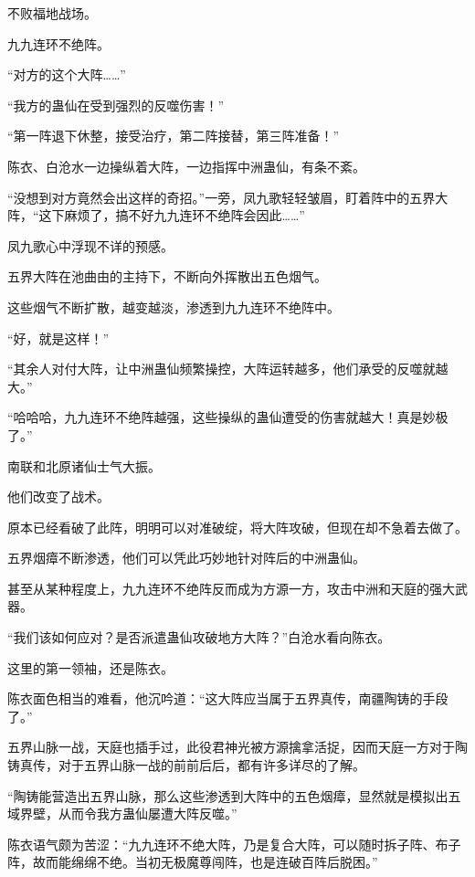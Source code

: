 
\begin{this_body}



不败福地战场。

九九连环不绝阵。

“对方的这个大阵……”

“我方的蛊仙在受到强烈的反噬伤害！”

“第一阵退下休整，接受治疗，第二阵接替，第三阵准备！”

陈衣、白沧水一边操纵着大阵，一边指挥中洲蛊仙，有条不紊。

“没想到对方竟然会出这样的奇招。”一旁，凤九歌轻轻皱眉，盯着阵中的五界大阵，“这下麻烦了，搞不好九九连环不绝阵会因此……”

凤九歌心中浮现不详的预感。

五界大阵在池曲由的主持下，不断向外挥散出五色烟气。

这些烟气不断扩散，越变越淡，渗透到九九连环不绝阵中。

“好，就是这样！”

“其余人对付大阵，让中洲蛊仙频繁操控，大阵运转越多，他们承受的反噬就越大。”

“哈哈哈，九九连环不绝阵越强，这些操纵的蛊仙遭受的伤害就越大！真是妙极了。”

南联和北原诸仙士气大振。

他们改变了战术。

原本已经看破了此阵，明明可以对准破绽，将大阵攻破，但现在却不急着去做了。

五界烟瘴不断渗透，他们可以凭此巧妙地针对阵后的中洲蛊仙。

甚至从某种程度上，九九连环不绝阵反而成为方源一方，攻击中洲和天庭的强大武器。

“我们该如何应对？是否派遣蛊仙攻破地方大阵？”白沧水看向陈衣。

这里的第一领袖，还是陈衣。

陈衣面色相当的难看，他沉吟道：“这大阵应当属于五界真传，南疆陶铸的手段了。”

五界山脉一战，天庭也插手过，此役君神光被方源擒拿活捉，因而天庭一方对于陶铸真传，对于五界山脉一战的前前后后，都有许多详尽的了解。

“陶铸能营造出五界山脉，那么这些渗透到大阵中的五色烟瘴，显然就是模拟出五域界壁，从而令我方蛊仙屡遭大阵反噬。”

陈衣语气颇为苦涩：“九九连环不绝大阵，乃是复合大阵，可以随时拆子阵、布子阵，故而能绵绵不绝。当初无极魔尊闯阵，也是连破百阵后脱困。”


\end{this_body}
